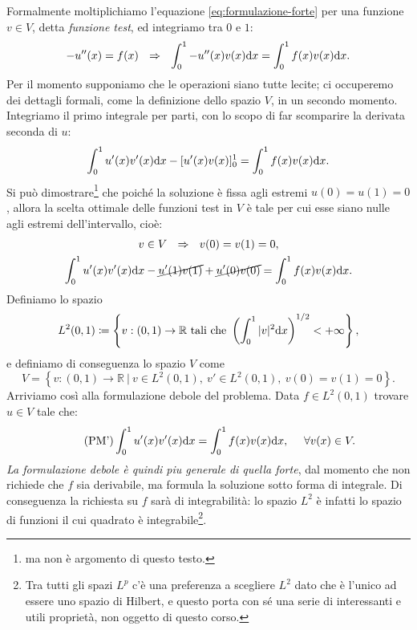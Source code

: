 Formalmente moltiplichiamo l'equazione \eqref{eq:formulazione-forte} per una funzione $v\in V$, detta \textit{funzione test}, ed integriamo tra $0$ e $1$:
\begin{equation*}
	-u''(x) =f(x)\ \ \Rightarrow\ \ \int\nolimits ^{1}_{0} -u''(x) v(x) \dx=\int\nolimits ^{1}_{0} f(x) v(x) \dx.
\end{equation*}
Per il momento supponiamo che le operazioni siano tutte lecite; ci occuperemo dei dettagli formali, come la definizione dello spazio $V$, in un secondo momento.
Integriamo il primo integrale per parti, con lo scopo di far scomparire la derivata seconda di $u$:
\begin{equation*}
	\int\nolimits ^{1}_{0} u'(x) v'(x) \mathrm d x-[ u'(x) v(x)]^{1}_{0} =\int\nolimits ^{1}_{0} f(x) v(x) \mathrm d x.
\end{equation*}
Si può dimostrare\footnote{ma non è argomento di questo testo.} che poiché la soluzione è fissa agli estremi $u(0) =u(1) =0$, allora la scelta ottimale delle funzioni test in $V$ è tale per cui esse siano nulle agli estremi dell'intervallo, cioè:
\begin{gather*}
	v\in V\ \ \Rightarrow \ \ v(0) =v(1) =0,\\
	\int\nolimits ^{1}_{0} u'(x) v'(x) \mathrm d x-\cancel{u'(1) v(1)} +\cancel{u'(0) v(0)} =\int\nolimits ^{1}_{0} f(x) v(x) \mathrm d x.
\end{gather*}
Definiamo lo spazio
\begin{equation*}
	L^{2}( 0,1) \coloneqq \left\{v:( 0,1)\rightarrow \mathbb{R} \ \text{tali che} \ \left(\int ^{1}_{0}| v| ^{2} \mathrm d x\right)^{1/2} < +\infty \right\} ,
\end{equation*}
e definiamo di conseguenza lo spazio $V$ come
\begin{equation*}
	V=\left\{v:( 0,1)\rightarrow \mathbb{R} \ |\ v\in L^{2}( 0,1) ,\ v'\in L^{2}( 0,1) ,\ v(0) =v(1) =0\right\} .
\end{equation*}
Arriviamo così alla formulazione debole del problema. Data $f \in L^{2}(0,1)$ trovare $u \in V$ tale che:
\begin{equation}\tag{PM'}
	\displaystyle\int\nolimits ^{1}_{0} u'(x) v'(x) \mathrm d x=\int\nolimits ^{1}_{0} f(x) v(x) \mathrm d x,\ \ \ \ \forall v(x) \in V.
	\label{eq:formulazione-debole}
\end{equation}
\textit{La formulazione debole è quindi piu generale di quella forte}, dal momento che non richiede che $f$ sia derivabile, ma formula la soluzione sotto forma di integrale. Di conseguenza la richiesta su $f$ sarà di integrabilità: lo spazio $L^{2} $ è infatti lo spazio di funzioni il cui quadrato è integrabile\footnote{Tra tutti gli spazi $L^{p} $ c'è una preferenza a scegliere $L^2$ dato che è l'unico ad essere uno spazio di Hilbert, e questo porta con sé una serie di interessanti e utili proprietà, non oggetto di questo corso.}.

